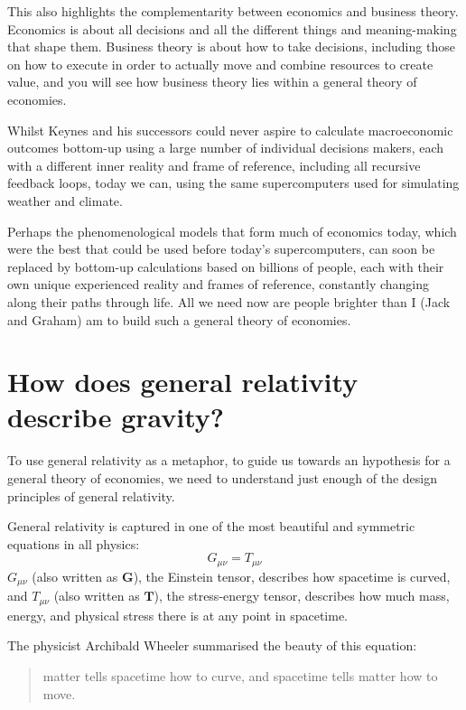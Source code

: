 This also highlights the complementarity between economics and business theory. Economics is about all decisions and all the different things and meaning\hyp{}making that shape them. Business theory is about how to take decisions, including those on how to execute in order to actually move and combine resources to create value, and you will see how business theory lies within a general theory of economies.




Whilst Keynes and his successors could never aspire to calculate macroeconomic outcomes bottom\hyp{}up using a large number of individual decisions makers, each with a different inner reality and frame of reference, including all recursive feedback loops, today we can, using the same supercomputers used for simulating weather and climate. 


Perhaps the phenomenological models that form much of economics  today, which were the best that could be used before today’s supercomputers, can soon be replaced by bottom\hyp{}up calculations based on billions of people, each with their own unique experienced reality and frames of reference, constantly changing along their paths through life. All we need now are people brighter than I (Jack and Graham) am to build such a general theory of economies.


\section*{How does general relativity describe gravity?}
To use general relativity as a metaphor, to guide us towards an hypothesis for a general theory of economies, we need to understand just enough of the design principles of general relativity.


General relativity is captured in one of the most beautiful and symmetric equations in all physics:
\begin{equation}
        G_{\mu\nu} = T_{\mu\nu}
\end{equation}
$G_{\mu\nu}$ (also written as $\mathbf{G}$), the Einstein tensor,  describes how spacetime is curved, and
$T_{\mu\nu}$ (also written as $\mathbf{T}$), the stress\hyp{}energy tensor, describes how much mass, energy,  and physical stress there is at any point in spacetime.


The physicist Archibald Wheeler summarised the beauty of this equation: \begin{quote}
matter tells spacetime how to curve, and spacetime tells matter how to move.
\end{quote}


